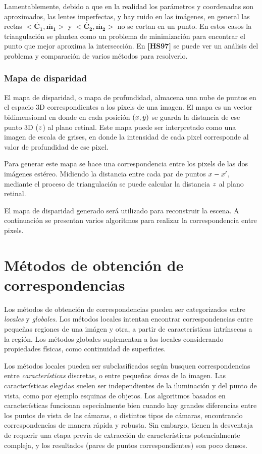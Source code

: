 \documentclass[11pt,a4paper,titlepage]{article}
\newcommand{\Cite}[1]{\textbf{[#1]}}
\newcommand{\Scalar}[1]{\ensuremath{\mathnormal{#1}}}
\newcommand{\TwoCart}[1]{\ensuremath{\mathbf{\dot{#1}}}}
\newcommand{\ThreeCart}[1]{\ensuremath{\mathbf{\dot{#1}}}}
\begin{document}
Lamentablemente, debido a que en la realidad los parámetros y coordenadas son aproximados, las lentes imperfectas, y hay ruido en las imágenes, en general las rectas $<\ThreeCart{C_1}, \TwoCart{m_1}>$ y $<\ThreeCart{C_2}, \TwoCart{m_2}>$ no se cortan en un punto. En estos casos la triangulación se plantea como un problema de minimización para encontrar el punto que mejor aproxima la intersección. En \Cite{HS97} se puede ver un análisis del problema y comparación de varios métodos para resolverlo.

\subsubsection{Mapa de disparidad}

El mapa de disparidad, o mapa de profundidad, almacena una nube de puntos en el espacio 3D correspondientes a los pixels de una imagen. El mapa es un vector bidimensional en donde en cada posición $(\Scalar{x}, \Scalar{y})$ se guarda la distancia de ese punto 3D (\Scalar{z}) al plano retinal. Este mapa puede ser interpretado como una imagen de escala de grises, en donde la intensidad de cada pixel corresponde al valor de profundidad de ese pixel.

Para generar este mapa se hace una correspondencia entre los pixels de las dos imágenes estéreo. Midiendo la distancia entre cada par de puntos $\Scalar{x} - \Scalar{x'}$, mediante el proceso de triangulación se puede calcular la distancia \Scalar{z} al plano retinal.

El mapa de disparidad generado será utilizado para reconstruir la escena. A continuación se presentan varios algoritmos para realizar la correspondencia entre pixels.

\newpage

\section{Métodos de obtención de correspondencias}

Los métodos de obtención de correspondencias pueden ser categorizados entre \textit{locales} y \textit{globales}. Los métodos locales intentan encontrar correspondencias entre pequeñas regiones de una imágen y otra, a partir de características intrínsecas a la región. Los métodos globales suplementan a los locales considerando propiedades físicas, como continuidad de superficies.

Los métodos locales pueden ser subclasificados según busquen correspondencias entre \textit{características} discretas, o entre pequeñas \textit{áreas} de la imagen. Las características elegidas suelen ser independientes de la iluminación y del punto de vista, como por ejemplo esquinas de objetos. Los algoritmos basados en características funcionan especialmente bien cuando hay grandes diferencias entre los puntos de vista de las cámaras, o distintos tipos de cámaras, encontrando correspondencias de manera rápida y robusta. Sin embargo, tienen la desventaja de requerir una etapa previa de extracción de características potencialmente compleja, y los resultados (pares de puntos correspondientes) son poco densos.
\end{document}
